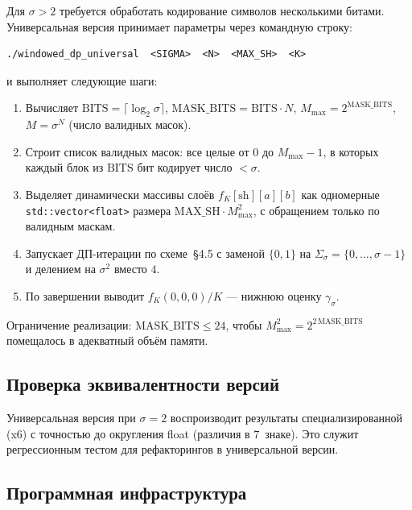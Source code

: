 Для $\sigma > 2$ требуется обработать кодирование символов несколькими битами. Универсальная версия принимает параметры через командную строку:
\begin{lstlisting}[basicstyle=\small\ttfamily,
                   caption={Сигнатура командной строки универсальной версии (\texttt{src/windowed\_dp\_universal.cpp}, репозиторий~\cite{ourgithub})},
                   label={lst:universal-cli}]
./windowed_dp_universal  <SIGMA>  <N>  <MAX_SH>  <K>
\end{lstlisting}
и выполняет следующие шаги:
\begin{enumerate}
    \item Вычисляет $\mathrm{BITS} = \lceil \log_2 \sigma \rceil$, $\mathrm{MASK\_BITS} = \mathrm{BITS} \cdot N$, $M_{\max} = 2^{\mathrm{MASK\_BITS}}$, $M = \sigma^N$ (число валидных масок).
    \item Строит список валидных масок: все целые от $0$ до $M_{\max} - 1$, в которых каждый блок из $\mathrm{BITS}$ бит кодирует число $< \sigma$.
    \item Выделяет динамически массивы слоёв $f_K[\mathrm{sh}][a][b]$ как одномерные \texttt{std::vector<float>} размера $\mathrm{MAX\_SH} \cdot M_{\max}^2$, с обращением только по валидным маскам.
    \item Запускает ДП-итерации по схеме~\S4.5 с заменой $\{0,1\}$ на $\Sigma_\sigma = \{0, \ldots, \sigma-1\}$ и делением на $\sigma^2$ вместо $4$.
    \item По завершении выводит $f_K(0,0,0) / K$ --- нижнюю оценку $\gamma_\sigma$.
\end{enumerate}

Ограничение реализации: $\mathrm{MASK\_BITS} \leq 24$, чтобы $M_{\max}^2 = 2^{2\,\mathrm{MASK\_BITS}}$ помещалось в адекватный объём памяти.

\subsection{Проверка эквивалентности версий}

Универсальная версия при $\sigma = 2$ воспроизводит результаты специализированной (x6) с точностью до округления float (различия в $7$~знаке). Это служит регрессионным тестом для рефакторингов в универсальной версии.

\subsection{Программная инфраструктура}

